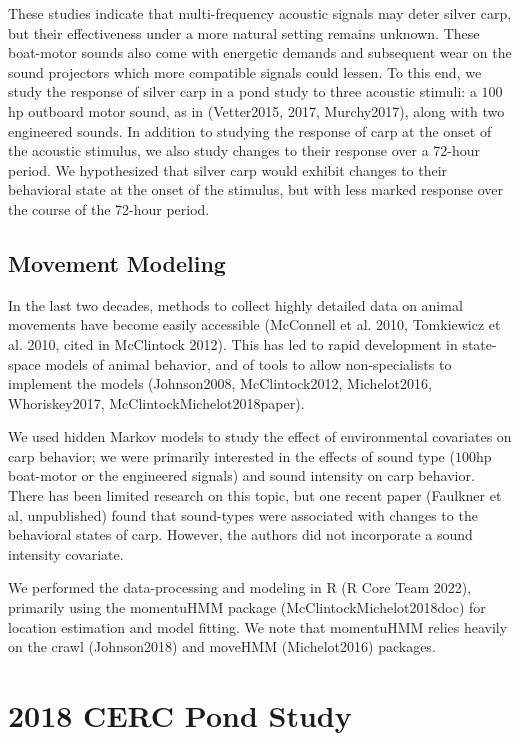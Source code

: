 \documentclass[12pt]{article}
\begin{document}
	These studies indicate that multi-frequency acoustic signals may deter silver carp, but their effectiveness under a more natural setting remains unknown. These boat-motor sounds also come with energetic demands and subsequent wear on the sound projectors which more compatible signals could lessen. To this end, we study the response of silver carp in a pond study to three acoustic stimuli: a $100$hp outboard motor sound, as in (Vetter2015, 2017, Murchy2017), along with two engineered sounds. In addition to studying the response of carp at the onset of the acoustic stimulus, we also study changes to their response over a 72-hour period. We hypothesized that silver carp would exhibit changes to their behavioral state at the onset of the stimulus, but with less marked response over the course of the 72-hour period.

	\subsection{Movement Modeling}
	
	In the last two decades, methods to collect highly detailed data on animal movements have become easily accessible (McConnell et al. 2010, Tomkiewicz et al. 2010, cited in McClintock 2012). This has led to rapid development in state-space models of animal behavior, and of tools to allow non-specialists to implement the models (Johnson2008, McClintock2012, Michelot2016, Whoriskey2017, McClintockMichelot2018paper).
	
	We used hidden Markov models to study the effect of environmental covariates on carp behavior; we were primarily interested in the effects of sound type ($100$hp boat-motor or the engineered signals) and sound intensity on carp behavior. There has been limited research on this topic, but one recent paper (Faulkner et al, unpublished) found that sound-types were associated with changes to the behavioral states of carp. However, the authors did not incorporate a sound intensity covariate.
	
	We performed the data-processing and modeling in R (R Core Team 2022), primarily using the momentuHMM package (McClintockMichelot2018doc) for location estimation and model fitting. We note that momentuHMM relies heavily on the crawl (Johnson2018) and moveHMM (Michelot2016) packages.

\section{2018 CERC Pond Study}
\end{document}
